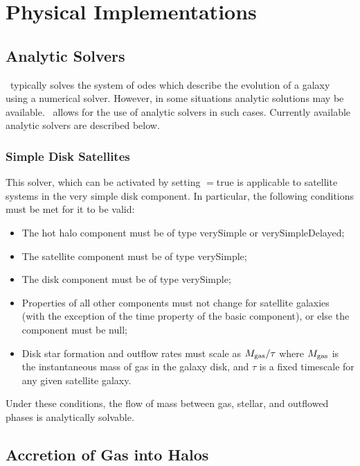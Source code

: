 \chapter{Physical Implementations}

\section{Analytic Solvers}

\glc\ typically solves the system of \glspl{ode} which describe the evolution of a galaxy using a numerical solver. However, in some situations analytic solutions may be available. \glc\ allows for the use of analytic solvers in such cases. Currently available analytic solvers are described below.

\subsection{Simple Disk Satellites}

This solver, which can be activated by setting {\normalfont \ttfamily [diskVerySimpleUseAnalyticSolver]}$=${\normalfont \ttfamily true} is applicable to satellite systems in the very simple disk component. In particular, the following conditions must be met for it to be valid:
\begin{itemize}
\item The hot halo component must be of type {\normalfont \ttfamily verySimple} or {\normalfont \ttfamily verySimpleDelayed};
\item The satellite component must be of type {\normalfont \ttfamily verySimple};
\item The disk component must be of type {\normalfont \ttfamily verySimple};
\item Properties of all other components must not change for satellite galaxies (with the exception of the {\normalfont \ttfamily time} property of the basic component), or else the component must be {\normalfont \ttfamily null};
  \item Disk star formation and outflow rates must scale as $M_{\rm gas}/\tau$ where $M_{\rm gas}$ is the instantaneous mass of gas in the galaxy disk, and $\tau$ is a fixed timescale for any given satellite galaxy.
\end{itemize}
Under these conditions, the flow of mass between gas, stellar, and outflowed phases is analytically solvable.

\section{Accretion of Gas into Halos}\label{sec:AccretionBaryonic}

